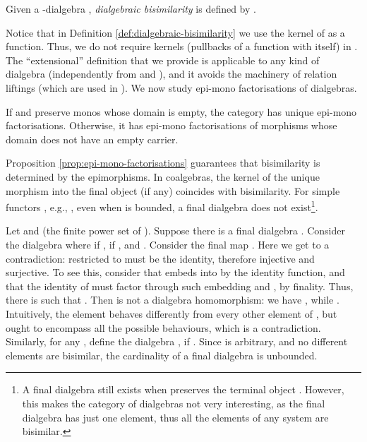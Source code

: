 \documentclass[orivec]{llncs}
\newcommand{\defend}{}
\renewenvironment{definition}{\begin{defn}}{\defend\end{defn}}
\begin{document}
\begin{definition}\label{def:dialgebraic-bisimilarity}
	Given a -dialgebra , \emph{dialgebraic bisimilarity}  is defined by . 
\end{definition}
\medskip

Notice that in Definition \ref{def:dialgebraic-bisimilarity} we use the kernel of  as a function. Thus, we do not require kernels (pullbacks of a function with itself) in . The ``extensional'' definition that we provide is applicable to any kind of dialgebra (independently from  and ), and it avoids the machinery of relation liftings (which are used in \cite{PZ01}). We now study epi-mono factorisations of dialgebras. 

\begin{proposition}\label{prop:epi-mono-factorisations}
	If  and  preserve monos whose domain is empty, the category  has unique epi-mono factorisations. Otherwise, it has epi-mono factorisations of morphisms whose domain does not have an empty carrier.
\end{proposition}

Proposition \ref{prop:epi-mono-factorisations} guarantees that bisimilarity is determined by the  epimorphisms.  
In coalgebras, the kernel of the unique morphism into the final object (if any) coincides with bisimilarity. For simple functors , e.g., , even when  is bounded, a final dialgebra does not exist\footnote{A final dialgebra still exists when  preserves the terminal object \cite{Vou10}. However, this makes the category of dialgebras not very interesting, as the final dialgebra has just one element, thus all the elements of any system are bisimilar.}.

\begin{example}\label{exa:lack-of-final-dialgebra}
Let  and  (the finite power set of ). Suppose there is a final dialgebra . Consider the dialgebra  where  if ,  if , and . Consider the final map . Here we get to a contradiction:  restricted to  must be the identity, therefore injective and surjective. To see this, consider that  embeds into  by the identity function, and that the identity of  must factor through such embedding and , by finality. Thus, there is  such that . Then  is not a dialgebra homomorphism: we have , while .
Intuitively, the element  behaves differently from every other element of , but  ought to encompass all the possible behaviours, which is a contradiction.
Similarly, for any , define the dialgebra ,  if . Since  is arbitrary, and no different elements are bisimilar, the cardinality of a final dialgebra is unbounded.
\end{example}
\end{document}
